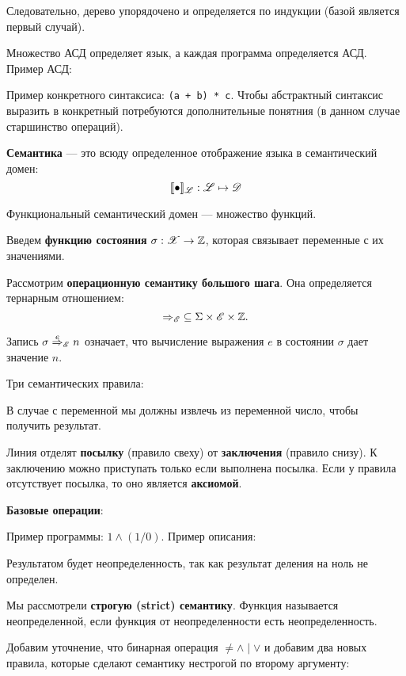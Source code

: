 Следовательно, дерево упорядочено и определяется по индукции (базой является
первый случай).


Множество АСД определяет язык, а каждая программа определяется АСД. Пример АСД:


Пример конкретного синтаксиса: \texttt{(a + b) * c}. Чтобы абстрактный
синтаксис выразить в конкретный потребуются дополнительные понятния (в данном
случае старшинство операций).

\textbf{Семантика} --- это всюду определенное отображение языка в семантический
домен:
\[
    \llbracket \bullet \rrbracket_{\mathscr{L}} : \mathscr{L} \mapsto \mathscr{D}
\]

Функциональный семантический домен --- множество функций.

Введем \textbf{функцию состояния} $\sigma : \mathscr{X} \to \mathbb{Z}$, которая
связывает переменные с их значениями.

Рассмотрим \textbf{операционную семантику большого шага}. Она определяется тернарным
отношением:
\[
    \neatarrow_\Lexpr\; \subseteq \Sigma \times \Lexpr \times \mathbb{Z}.
\]

Запись $\sigma \overset{e}{\neatarrow}_\Lexpr n$ означает, что вычисление
выражения $e$ в состоянии $\sigma$ дает значение $n$.

Три семантических правила:


В случае с переменной мы должны извлечь из переменной число, чтобы получить
результат.

Линия отделят \textbf{посылку} (правило свеху) от \textbf{заключения} (правило снизу). К заключению можно
приступать только если выполнена посылка. Если у правила отсутствует посылка,
то оно является \textbf{аксиомой}. 

\textbf{Базовые операции}:


Пример программы: $1 \land (1 / 0)$. Пример описания:


Результатом будет неопределенность, так как результат деления на ноль не
определен.

Мы рассмотрели \textbf{строгую (strict) семантику}. Функция называется
неопределенной, если функция от неопределенности есть неопределенность.

Добавим уточнение, что бинарная операция $ \neq \land \mid \lor$ и
добавим два новых правила, которые сделают семантику нестрогой по второму аргументу:

